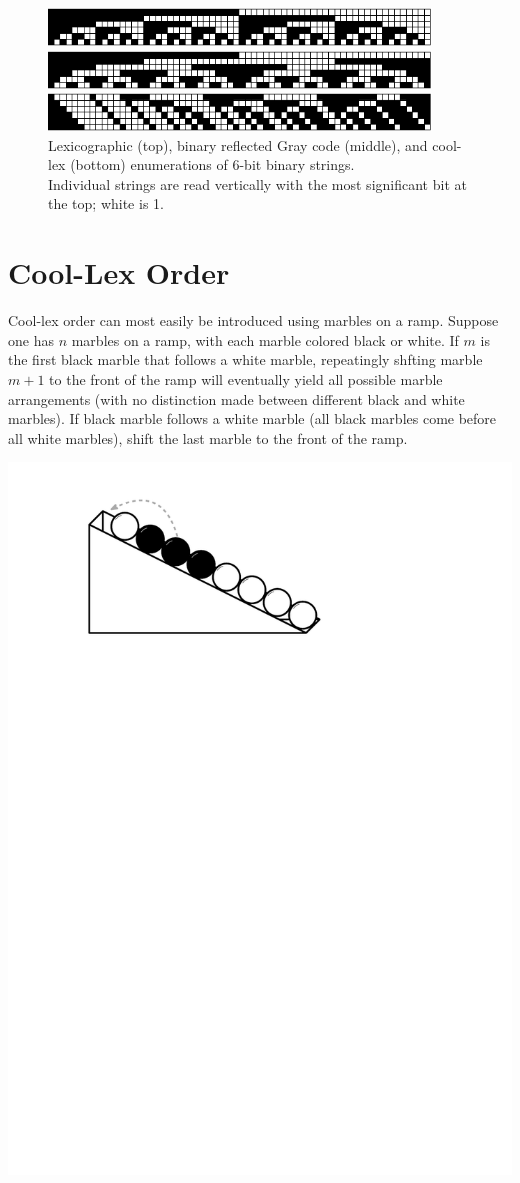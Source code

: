\begin{figure}
    \centering
\includegraphics[width=4in]{BLX6-cropped.pdf} 

\includegraphics[width=4in]{BRGC6-cropped.pdf} 

\includegraphics[width=4in]{BCLX6-cropped.pdf} 

    \caption{Lexicographic (top), binary reflected Gray code (middle), and cool-lex (bottom) enumerations of 6-bit binary strings. \\ 
    Individual strings are read vertically with the most significant bit at the top; white is 1.
    }
    \label{binary}
\end{figure}

\section{Cool-Lex Order} \label{sec:coolIntro}

Cool-lex order can most easily be introduced using marbles on a ramp. Suppose one has $n$ marbles on a ramp, with each marble colored black or white.  If $m$ is the first black marble that follows a white  marble, repeatingly shfting marble $m+1$ to the front of the ramp will eventually yield all possible marble arrangements (with no distinction made between different black and white marbles). If black marble follows a white marble (all black marbles come before all white marbles), shift the last marble to the front of the ramp. 

\includegraphics[width=.3\textwidth]{figures/marbles_first_arrow.pdf} 

